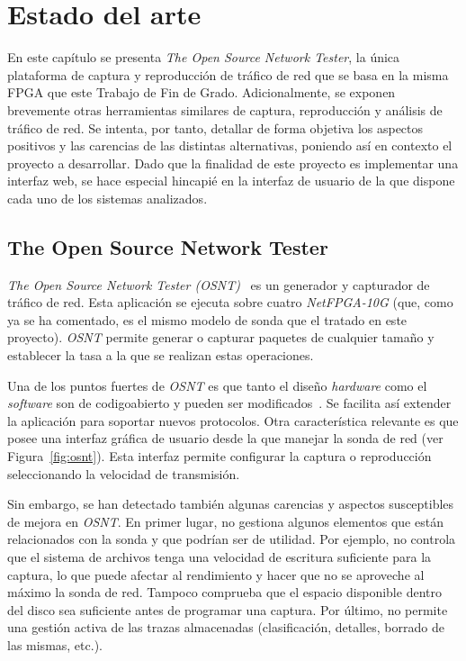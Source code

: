 \chapter{Estado del arte\label{cap:estadoDelArte}}

En este capítulo se presenta \textit{The Open Source Network Tester}, la única plataforma de captura y reproducción de tráfico de red que se basa en la misma \gls{FPGA} que este Trabajo de Fin de Grado.
Adicionalmente, se exponen brevemente otras herramientas similares de captura, reproducción y análisis de tráfico de red.
Se intenta, por tanto, detallar de forma objetiva los aspectos positivos y las carencias de las distintas alternativas, poniendo así en contexto el proyecto a desarrollar.
Dado que la finalidad de este proyecto es implementar una interfaz web, se hace especial hincapié en la interfaz de usuario de la que dispone cada uno de los sistemas analizados.

\section{The Open Source Network Tester\label{sec:eda:osnt}}

\textit{The Open Source Network Tester (OSNT)}~\cite{osntpaper, osntarch, netfpga} es un generador y capturador de tráfico de red.
Esta aplicación se ejecuta sobre cuatro \textit{NetFPGA-10G} (que, como ya se ha comentado, es el mismo modelo de sonda que el tratado en este proyecto).
\textit{OSNT} permite generar o capturar paquetes de cualquier tamaño y establecer la tasa a la que se realizan estas operaciones.

Una de los puntos fuertes de \textit{OSNT} es que tanto el diseño \textit{hardware} como el \textit{software} son de \gls{codigoabierto} y pueden ser modificados~\cite{osnt}.
Se facilita así extender la aplicación para soportar nuevos protocolos.
Otra característica relevante es que posee una interfaz gráfica de usuario desde la que manejar la sonda de red (ver Figura~\ref{fig:osnt}).
Esta interfaz permite configurar la captura o reproducción seleccionando la velocidad de transmisión.

Sin embargo, se han detectado también algunas carencias y aspectos susceptibles de mejora en \textit{OSNT}.
En primer lugar, no gestiona algunos elementos que están relacionados con la sonda y que podrían ser de utilidad.
Por ejemplo, no controla que el sistema de archivos tenga una velocidad de escritura suficiente para la captura, lo que puede afectar al rendimiento y hacer que no se aproveche al máximo la sonda de red.
Tampoco comprueba que el espacio disponible dentro del disco sea suficiente antes de programar una captura.
Por último, no permite una gestión activa de las \glspl{traza} almacenadas (clasificación, detalles, borrado de las mismas, etc.).

